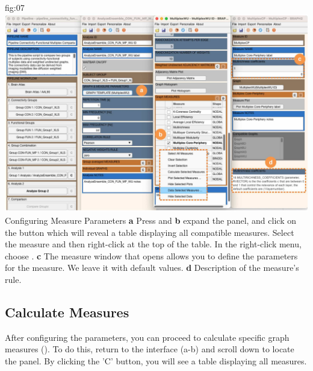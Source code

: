 \documentclass[justified]{tufte-handout}
\begin{document}
	{fig:07}
	{\includegraphics{fig07.jpg}}
	{Configuring Measure Parameters}
	{
        {\bf a} Press  and
	{\bf b} expand the  panel, and click on the  button which will reveal a table displaying all compatible measures. 
	Select the  measure and then right-click at the top of the table. In the right-click menu, choose .
	{\bf c} The measure window that opens allows you to define the parameters for the  measure. We leave it with default values.
    {\bf d} Description of the  measure's rule.
	}
 
 
\clearpage

\subsection{Calculate Measures}
 
After configuring the parameters, you can proceed to calculate specific graph measures (). To do this, return to the  interface (a-b) and scroll down to locate the  panel. By clicking the 'C' button, you will see a table displaying all measures.
\end{document}
